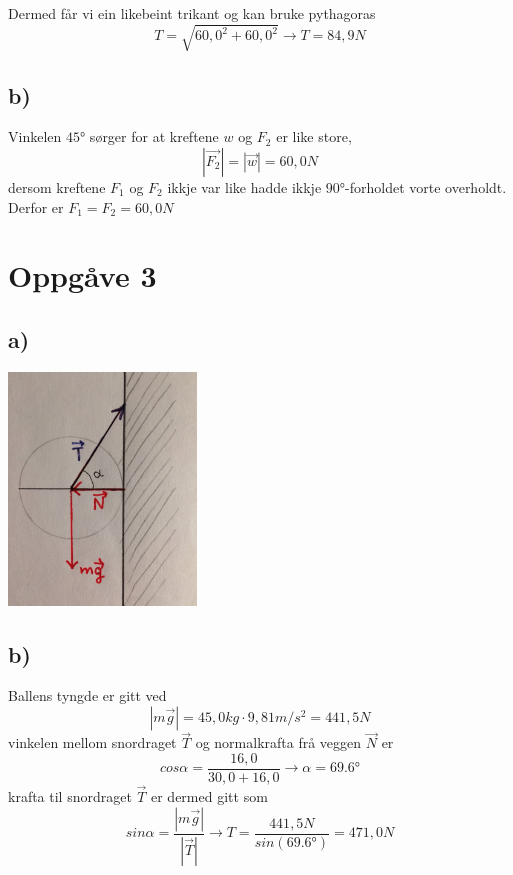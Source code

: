 \documentclass[12pt,a4paper]{article}
\begin{document}
    Dermed får vi ein likebeint trikant og kan bruke pythagoras
    \begin{equation}
      T = \sqrt{60,0^2 + 60,0^2} \rightarrow T = 84,9N
    \end{equation}

    \subsection*{b)}
    Vinkelen $\ang{45}$ sørger for at kreftene $w$ og $F_2$ er like store, 
    \begin{equation}
      |\vec{F_2}| = |\vec{w}| = 60,0N
    \end{equation}
    dersom kreftene $F_1$ og $F_2$ ikkje var like hadde ikkje 
    $\ang{90}$-forholdet vorte overholdt. Derfor er $F_1 = F_2 = 60,0N$

  \section*{Oppgåve 3}
    \subsection*{a)}

    \begin{center}
      \includegraphics[width=50mm]{02_03a}
    \end{center}

    \subsection*{b)}
    Ballens tyngde er gitt ved
    \begin{equation}
      |m\vec{g}| = 45,0kg\cdot9,81m/s^2 = 441,5N
    \end{equation}
    vinkelen mellom snordraget $\vec{T}$ og normalkrafta frå veggen $\vec{N}$ er
    \begin{equation}
      cos \alpha = \frac{16,0}{30,0+16,0} \rightarrow \alpha = \ang{69,6}
    \end{equation}
    krafta til snordraget $\vec{T}$ er dermed gitt som
    \begin{equation}
      sin \alpha = \frac{|m\vec{g}|}{|\vec{T}|} \rightarrow
      T = \frac{441,5N}{sin(\ang{69,6})} = 471,0N
    \end{equation}
\end{document}
